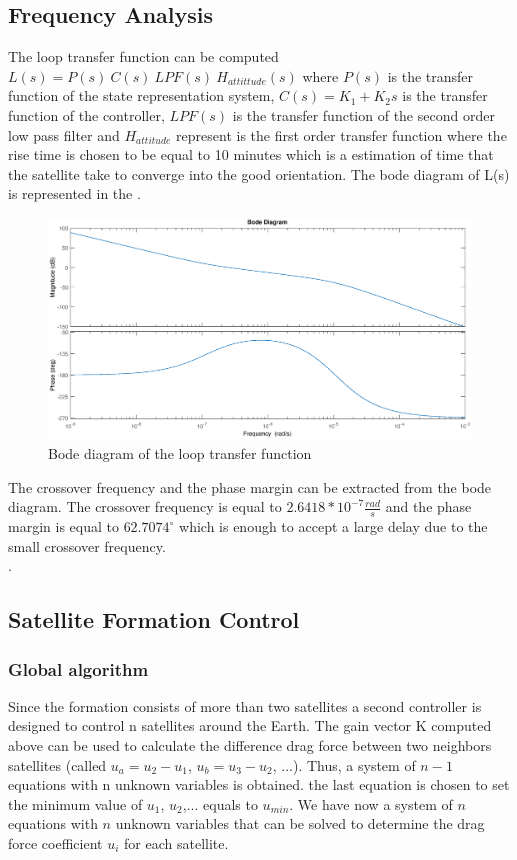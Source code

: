  \subsection{Frequency Analysis}
The loop transfer function can be computed $L(s) = P(s) \ C(s) \ LPF(s) \ H_{attittude}(s)$ where $P(s)$ is the transfer function of the state representation system, $C(s) = K_1 + K_2 s$ is the transfer function of the controller, $LPF(s)$ is the transfer function of the second order low pass filter and $H_{attitude}$ represent is the first order transfer function where the rise time is chosen to be equal to 10 minutes which is a estimation of time that the satellite take to converge into the good orientation.
The bode diagram of L(s) is represented in the . \\
\begin{figure}[H]
	\centering
	\includegraphics[width=0.9\linewidth]
	{figures/Bode_L.eps}
	\caption{Bode diagram of the loop transfer function}
	\label{fig:Bode_L}
\end{figure}
The crossover frequency and the phase margin can be extracted from the bode diagram. The crossover frequency is equal to $2.6418*10^{-7}\frac{rad}{s}$ and the phase margin is equal to $62.7074^{\circ}$ which is enough to accept a large delay due to the small crossover frequency. \\.
 
\subsection{Satellite Formation Control} 
\subsubsection{Global algorithm}
Since the formation consists of more than two satellites a second controller is designed to control n satellites around the Earth. The gain vector K computed above can be used to calculate the difference drag force between two neighbors satellites (called $u_a = u_2 - u_1$, $u_b = u_3 - u_2$, ...). Thus, a system of $n-1$ equations with n unknown variables is obtained. the last equation is chosen to set the minimum value of $u_1$, $u_2$,... equals to $u_{min}$. We have now a system of $n$ equations with $n$ unknown variables that can be solved to determine the drag force coefficient $u_i$ for each satellite.
